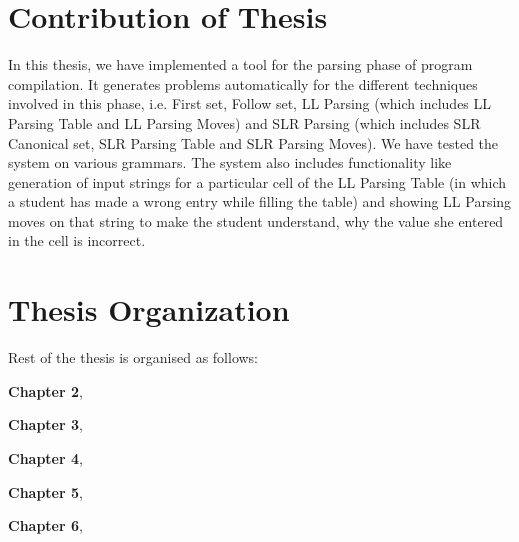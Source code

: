 \section{Contribution of Thesis}
\label{contribution}
In this thesis, we have implemented a tool for the parsing phase of program compilation. It generates problems automatically for the different techniques involved in this phase, i.e. First set, Follow set, LL Parsing (which includes LL Parsing Table and LL Parsing Moves) and SLR Parsing (which includes SLR Canonical set, SLR Parsing Table and SLR Parsing Moves). We have tested the system on various grammars. The system also includes functionality like generation of input strings for a particular cell of the LL Parsing Table (in which a student has made a wrong entry while filling the table) and showing LL Parsing moves on that string to make the student understand, why the value she entered in the cell is incorrect.

\section{Thesis Organization}
\label{organization}
Rest of the thesis is organised as follows:

\textbf{Chapter 2},

\textbf{Chapter 3},

\textbf{Chapter 4},

\textbf{Chapter 5},

\textbf{Chapter 6},